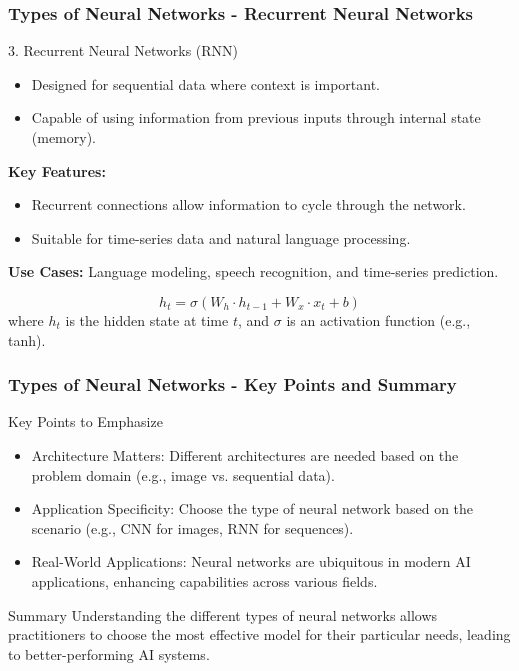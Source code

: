 \documentclass[aspectratio=169]{beamer}
\begin{document}
\begin{frame}[fragile]
    \frametitle{Types of Neural Networks - Recurrent Neural Networks}
    \begin{block}{3. Recurrent Neural Networks (RNN)}
        \begin{itemize}
            \item Designed for sequential data where context is important.
            \item Capable of using information from previous inputs through internal state (memory).
        \end{itemize}
        \textbf{Key Features:}
        \begin{itemize}
            \item Recurrent connections allow information to cycle through the network.
            \item Suitable for time-series data and natural language processing.
        \end{itemize}
        \textbf{Use Cases:} Language modeling, speech recognition, and time-series prediction.
    \end{block}
    \begin{equation}
        h_t = \sigma(W_h \cdot h_{t-1} + W_x \cdot x_t + b)
    \end{equation}
    where \( h_t \) is the hidden state at time \( t \), and \( \sigma \) is an activation function (e.g., tanh).
\end{frame}

\begin{frame}[fragile]
    \frametitle{Types of Neural Networks - Key Points and Summary}
    \begin{block}{Key Points to Emphasize}
        \begin{itemize}
            \item Architecture Matters: Different architectures are needed based on the problem domain (e.g., image vs. sequential data).
            \item Application Specificity: Choose the type of neural network based on the scenario (e.g., CNN for images, RNN for sequences).
            \item Real-World Applications: Neural networks are ubiquitous in modern AI applications, enhancing capabilities across various fields.
        \end{itemize}
    \end{block}
    \begin{block}{Summary}
        Understanding the different types of neural networks allows practitioners to choose the most effective model for their particular needs, leading to better-performing AI systems.
    \end{block}
\end{frame}
\end{document}
